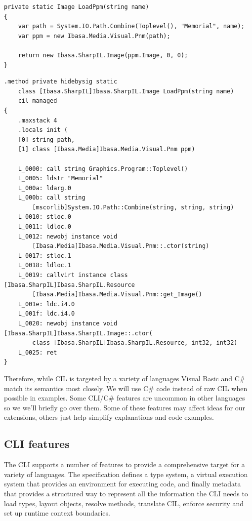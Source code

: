 \documentclass[english]{report}
\begin{document}
\begin{lstlisting}[keywordstyle={\color{blue}},language=sharpc,caption={LoadPpm C\#}]
private static Image LoadPpm(string name)
{
	var path = System.IO.Path.Combine(Toplevel(), "Memorial", name);
	var ppm = new Ibasa.Media.Visual.Pnm(path);

	return new Ibasa.SharpIL.Image(ppm.Image, 0, 0);
}
\end{lstlisting}
\begin{lstlisting}[caption={LoadPpm CIL},language=cil,label={lst:loadppm}]
.method private hidebysig static 
	class [Ibasa.SharpIL]Ibasa.SharpIL.Image LoadPpm(string name) 
	cil managed 
{
	.maxstack 4
	.locals init (
	[0] string path,
	[1] class [Ibasa.Media]Ibasa.Media.Visual.Pnm ppm)
 
	L_0000: call string Graphics.Program::Toplevel()
	L_0005: ldstr "Memorial"
	L_000a: ldarg.0
	L_000b: call string 
		[mscorlib]System.IO.Path::Combine(string, string, string)
	L_0010: stloc.0
	L_0011: ldloc.0
	L_0012: newobj instance void 
		[Ibasa.Media]Ibasa.Media.Visual.Pnm::.ctor(string)
	L_0017: stloc.1
	L_0018: ldloc.1
	L_0019: callvirt instance class [Ibasa.SharpIL]Ibasa.SharpIL.Resource
		[Ibasa.Media]Ibasa.Media.Visual.Pnm::get_Image()
	L_001e: ldc.i4.0
	L_001f: ldc.i4.0
	L_0020: newobj instance void [Ibasa.SharpIL]Ibasa.SharpIL.Image::.ctor(
		class [Ibasa.SharpIL]Ibasa.SharpIL.Resource, int32, int32)
	L_0025: ret
}
\end{lstlisting}


Therefore, while CIL is targeted by a variety of languages Visual Basic and C\#
match its semantics most closely. We will use C\# code instead
of raw CIL when possible in examples. Some CLI/C\# features are uncommon
in other languages so we we'll briefly go over them. Some of these
features may affect ideas for our extensions, others just help simplify
explanations and code examples.


\subsection{CLI features}

The CLI supports a number of features to provide a comprehensive target for a
variety of languages. The specification defines a type system, a virtual
execution system that provides an environment for executing code, and finally
metadata that provides a structured way to represent all the information the
CLI needs to load types, layout objects, resolve methods, translate CIL,
enforce security and set up runtime context boundaries. 
\end{document}
